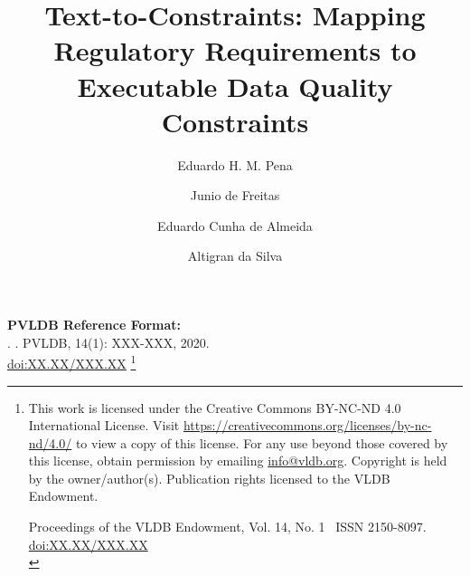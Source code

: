 \documentclass[sigconf, nonacm]{acmart}
\newcommand\vldbdoi{XX.XX/XXX.XX}
\newcommand\vldbpages{XXX-XXX}
\newcommand\vldbvolume{14}
\newcommand\vldbissue{1}
\newcommand\vldbyear{2020}
\newcommand\vldbauthors{\authors}
\newcommand\vldbtitle{\shorttitle}
\newcommand\vldbpagestyle{plain}
\begin{document}
\title{Text-to-Constraints: Mapping Regulatory Requirements to Executable Data Quality Constraints}

\author{Eduardo H. M. Pena}
  

\author{Junio de Freitas}

\author{Eduardo Cunha de Almeida}

\author{Altigran da Silva}



\begin{abstract}

\end{abstract}



\maketitle


\pagestyle{\vldbpagestyle}
\begingroup\small\noindent\raggedright\textbf{PVLDB Reference Format:}\\
\vldbauthors. \vldbtitle. PVLDB, \vldbvolume(\vldbissue): \vldbpages, \vldbyear.\\
\href{https://doi.org/\vldbdoi}{doi:\vldbdoi}
\endgroup
\begingroup
\renewcommand\thefootnote{}\footnote{\noindent
This work is licensed under the Creative Commons BY-NC-ND 4.0 International License. Visit \url{https://creativecommons.org/licenses/by-nc-nd/4.0/} to view a copy of this license. For any use beyond those covered by this license, obtain permission by emailing \href{mailto:info@vldb.org}{info@vldb.org}. Copyright is held by the owner/author(s). Publication rights licensed to the VLDB Endowment. \\
\raggedright Proceedings of the VLDB Endowment, Vol. \vldbvolume, No. \vldbissue\ %
ISSN 2150-8097. \\
\href{https://doi.org/\vldbdoi}{doi:\vldbdoi} \\
}\addtocounter{footnote}{-1}\endgroup
\end{document}
